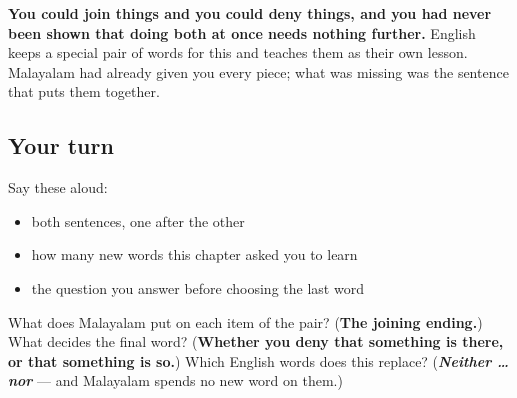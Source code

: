 \begin{grammarlens}[title={What you've built}]
\textbf{You could join things and you could deny things, and you had never been shown that doing both at once needs nothing further.} English keeps a special pair of words for this and teaches them as their own lesson. Malayalam had already given you every piece; what was missing was the sentence that puts them together.
\end{grammarlens}

\subsection*{Your turn}
Say these aloud:

\begin{itemize}
\raggedright
  \item both sentences, one after the other
  \item how many new words this chapter asked you to learn
  \item the question you answer before choosing the last word
\end{itemize}

\begin{tcolorbox}[breakable,colback=teal!4,colframe=teal!35!black,title={Before you move on}]
What does Malayalam put on each item of the pair? (\textbf{The joining ending.}) What decides the final word? (\textbf{Whether you deny that something is there, or that something is so.}) Which English words does this replace? (\emph{\textbf{Neither … nor}} — and Malayalam spends no new word on them.)
\end{tcolorbox}
